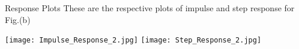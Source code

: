 \documentclass{beamer}
\theoremstyle{remark}
\numberwithin{equation}{section}
\begin{document}
\begin{frame}{Response Plots}
These are the respective plots of impulse and step response for Fig.(b)
 \begin{center}
         \texttt{[image: Impulse\_Response\_2.jpg]}
         \texttt{[image: Step\_Response\_2.jpg]}
     \end{center}
     
    
\end{frame}

%
%  
%
%
\end{document}
